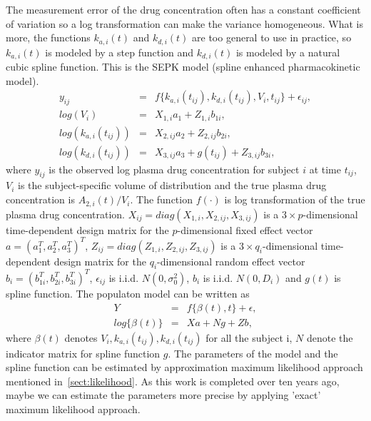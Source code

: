 \documentclass[12pt]{extarticle}
\begin{document}
The measurement error of the drug concentration often has a constant coefficient of variation so a log transformation can make the variance homogeneous. What is more, the functions  $k_{a,i}(t)$ and $k_{d,i}(t)$  are too general to use in practice, so $k_{a,i}(t)$ is modeled by a step function and $k_{d,i}(t)$ is modeled by a natural cubic spline function. This is the SEPK model (spline enhanced pharmacokinetic model). 
\begin{equation}
\begin{array}{rcl}
y_{ij} & = & f\{k_{a,i}(t_{ij}),k_{d,i}(t_{ij}),V_{i},t_{ij}\}+\epsilon_{ij}, \\
log(V_{i}) & = & X_{1,i}a_{1}+Z_{1,i}b_{1i}, \\
log(k_{a,i}(t_{ij})) & = & X_{2,ij}a_{2}+Z_{2,ij}b_{2i}, \\
log(k_{d,i}(t_{ij})) & = & X_{3,ij}a_{3}+g(t_{ij})+Z_{3,ij}b_{3i}, 
\end{array}
\end{equation}
where $y_{ij}$ is the observed log plasma drug concentration for subject $i$ at time $t_{ij}$, $V_{i}$ is the subject-specific volume of distribution and the true plasma drug concentration is $A_{2,i}(t)/V_{i}$. The function $f(\cdot)$ is log transformation of the true plasma drug concentration. $X_{ij}=diag(X_{1,i},X_{2,ij},X_{3,ij})$ is a $3\times{}p$-dimensional time-dependent design matrix for the $p$-dimensional fixed effect vector $a=(a_{1}^{T},a_{2}^{T},a_{3}^{T})^{T}$, $Z_{ij}=diag(Z_{1,i},Z_{2,ij},Z_{3,ij})$ is a  $3\times{}q_{i}$-dimensional time-dependent design matrix for the $q_{i}$-dimensional random effect vector $b_{i}=(b_{1i}^{T},b_{2i}^{T},b_{3i}^{T})^{T}$, $\epsilon_{ij}$ is i.i.d. $N(0,\sigma_{0}^{2})$, $b_{i}$ is i.i.d. $N(0,D_{i})$ and $g(t)$ is spline function. The populaton model can be written as
\begin{equation}
\begin{array}{rcl}
Y & = & f\{\beta(t),t\}+\epsilon, \\
log\{\beta(t)\} & = & Xa+Ng+Zb,
\end{array}
\end{equation} 
where $\beta(t)$ denotes $V_{i},k_{a,i}(t_{ij}),k_{d,i}(t_{ij})$ for all the subject i, $N$ denote the indicator matrix for spline function $g$. The parameters of the model and the spline function can be estimated by approximation maximum likelihood approach mentioned in~\ref{sect:likelihood}. As this work is completed over ten years ago, maybe we can estimate the parameters more precise by applying 'exact' maximum likelihood approach.
\end{document}
